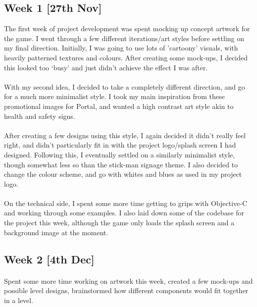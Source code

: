 \documentclass[a4paper,oneside]{report}
\begin{document}
\subsection{Week 1 [27th Nov]}

The first week of project development was spent mocking up concept artwork for the game. I went through a few different iterations/art styles before settling on my final direction. Initially, I was going to use lots of  ’cartoony’ visuals, with heavily patterned textures and colours. After creating some mock-ups, I decided this looked too ‘busy’ and just didn’t achieve the effect I was after.

\paragraph{} With my second idea, I decided to take a completely different direction, and go for a much more minimalist style. I took my main inspiration from these promotional images for Portal, and wanted a high contrast art style akin to health and safety signs.

\paragraph{}After creating a few designs using this style, I again decided it didn’t really feel right, and didn’t particularly fit in with the project logo/splash screen I had designed. Following this, I eventually settled on a similarly minimalist style, though somewhat less so than the stick-man signage theme. I also decided to change the colour scheme, and go with whites and blues as used in my project logo.

\paragraph{} On the technical side, I spent some more time getting to grips with Objective-C and working through some examples. I also laid down some of the codebase for the project this week, although the game only loads the splash screen and a background image at the moment.



\subsection{Week 2 [4th Dec]}

\paragraph{} Spent some more time working on artwork this week, created a few mock-ups and possible level designs, brainstormed how different components would fit together in a level.
\end{document}
